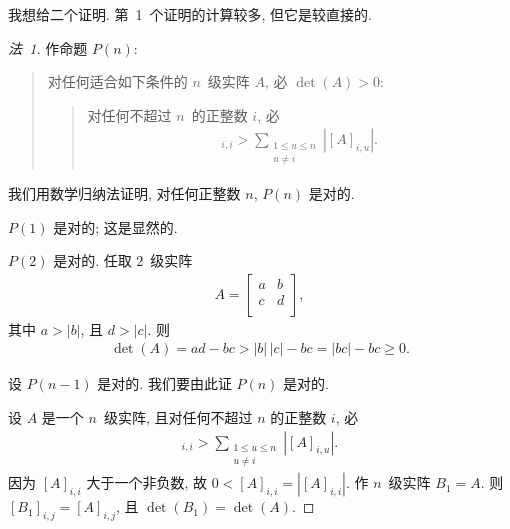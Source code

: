 



我想给二个证明.
第~1~个证明的计算较多, 但它是较直接的.

\begin{proof}[法~1]
    作命题 \(P(n)\):
    \begin{quotation}
        对任何适合如下条件的 \(n\)~级实阵 \(A\),
        必 \(\det {(A)} > 0\):
        \begin{quotation}
            对任何不超过 \(n\)~的正整数 \(i\),
            必
            \begin{align*}
                [A]_{i,i} >
                \sum_{\substack{1 \leq u \leq n \\
                    u \neq i}} {|[A]_{i,u}|}.
            \end{align*}
        \end{quotation}
    \end{quotation}
    我们用数学归纳法证明,
    对任何正整数 \(n\),
    \(P(n)\) 是对的.

    \(P(1)\) 是对的; 这是显然的.

    \(P(2)\) 是对的.
    任取 \(2\)~级实阵
    \begin{align*}
        A = \begin{bmatrix}
                a & b \\
                c & d \\
            \end{bmatrix},
    \end{align*}
    其中 \(a > |b|\), 且 \(d > |c|\).
    则
    \begin{align*}
        \det {(A)} = ad - bc > |b|\,|c| - bc
        = |bc| - bc \geq 0.
    \end{align*}

    设 \(P(n-1)\) 是对的.
    我们要由此证 \(P(n)\) 是对的.

    设 \(A\) 是一个 \(n\)~级实阵,
    且对任何不超过 \(n\) 的正整数 \(i\), 必
    \begin{align*}
        [A]_{i,i} >
        \sum_{\substack{1 \leq u \leq n \\
            u \neq i}} {|[A]_{i,u}|}.
    \end{align*}
    因为 \([A]_{i,i}\) 大于一个非负数,
    故 \(0 < [A]_{i,i} = |[A]_{i,i}|\).
    作 \(n\)~级实阵 \(B_1 = A\).
    则 \([B_1]_{i,j} = [A]_{i,j}\),
    且 \(\det {(B_1)} = \det {(A)}\).


\end{proof}
